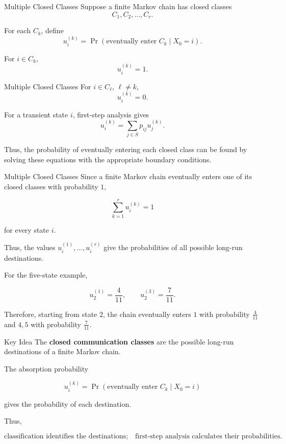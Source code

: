 \documentclass[
  ignorenonframetext,
  aspectratio=169,
]{beamer}
\begin{document}
\begin{frame}{Multiple Closed Classes}
\protect{}\label{multiple-closed-classes}
Suppose a finite Markov chain has closed classes \[
C_1,C_2,\ldots,C_r.
\]

For each \(C_k\), define \[
u_i^{(k)}
=
\Pr(\text{eventually enter }C_k\mid X_0=i).
\]

For \(i\in C_k\), \[
u_i^{(k)}=1.
\]
\end{frame}

\begin{frame}{Multiple Closed Classes}
\protect{}\label{multiple-closed-classes-1}
For \(i\in C_\ell\), \(\ell\neq k\), \[
u_i^{(k)}=0.
\]

For a transient state \(i\), first-step analysis gives \[
u_i^{(k)}
=
\sum_{j\in S}p_{ij}u_j^{(k)}.
\]

Thus, the probability of eventually entering each closed class can be
found by solving these equations with the appropriate boundary
conditions.
\end{frame}

\begin{frame}{Multiple Closed Classes}
\protect{}\label{multiple-closed-classes-2}
Since a finite Markov chain eventually enters one of its closed classes
with probability \(1\),

\[
\boxed{
\sum_{k=1}^r u_i^{(k)}=1
}
\]

for every state \(i\).

Thus, the values \(u_i^{(1)},\ldots,u_i^{(r)}\) give the probabilities
of all possible long-run destinations.

For the five-state example,

\[
u_2^{(1)}=\frac4{11},
\qquad
u_2^{(3)}=\frac7{11}.
\]

Therefore, starting from state \(2\), the chain eventually enters
\({1}\) with probability \(\frac4{11}\) and \({4,5}\) with probability
\(\frac7{11}\).
\end{frame}

\begin{frame}{Key Idea}
\protect{}\label{key-idea-1}
The \textbf{closed communication classes} are the possible long-run
destinations of a finite Markov chain.

The absorption probability

\[
u_i^{(k)}
=
\Pr(\text{eventually enter }C_k\mid X_0=i)
\]

gives the probability of each destination.

Thus,

\[
\boxed{
\text{classification identifies the destinations;}
\quad
\text{first-step analysis calculates their probabilities.}
}
\]
\end{frame}
\end{document}
